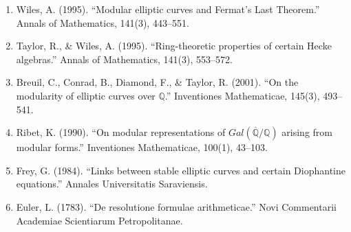 \begin{enumerate}
\item Wiles, A. (1995). ``Modular elliptic curves and Fermat's Last Theorem.'' Annals of Mathematics, 141(3), 443--551.
\item Taylor, R., \& Wiles, A. (1995). ``Ring-theoretic properties of certain Hecke algebras.'' Annals of Mathematics, 141(3), 553--572.
\item Breuil, C., Conrad, B., Diamond, F., \& Taylor, R. (2001). ``On the modularity of elliptic curves over $\mathbb{Q}$.'' Inventiones Mathematicae, 145(3), 493--541.
\item Ribet, K. (1990). ``On modular representations of $Gal(\overline{\mathbb{Q}}/\mathbb{Q})$ arising from modular forms.'' Inventiones Mathematicae, 100(1), 43--103.
\item Frey, G. (1984). ``Links between stable elliptic curves and certain Diophantine equations.'' Annales Universitatis Saraviensis.
\item Euler, L. (1783). ``De resolutione formulae arithmeticae.'' Novi Commentarii Academiae Scientiarum Petropolitanae.
\end{enumerate}